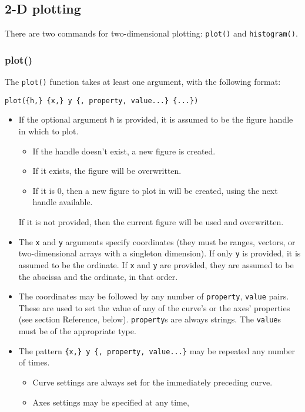\documentclass[11pt]{article}
\newcommand{\cmd}[1]{\texttt{#1}}
\begin{document}
\subsection{2-D plotting}

There are two commands for two-dimensional plotting: \cmd{plot()} and
\cmd{histogram()}.

\subsubsection{plot()}

The \cmd{plot()} function takes at least one argument, with the following
format:

\cmd{plot(\{h,\} \{x,\} y \{, property, value...\} \{...\})}

\begin{itemize}
	\item If the optional argument \cmd{h} is provided, it is assumed to be the
		figure handle in which to plot.
		\begin{itemize}
			\item If the handle doesn't exist, a new figure is created.
			\item If it exists, the figure will be overwritten.
			\item If it is 0, then a new figure to plot in will be created,
				using the next handle available.
		\end{itemize}
		If it is not provided, then the current figure will be used and
		overwritten.
	\item The \cmd{x} and \cmd{y} arguments specify coordinates (they must be ranges, vectors, or
		two-dimensional arrays with a singleton dimension). If only \cmd{y} is
		provided, it is assumed to be the ordinate. If \cmd{x} and \cmd{y} are provided, they
		are assumed to be the abscissa and the ordinate, in that order.
	\item The coordinates may be followed by any number of
		\cmd{property}, \cmd{value} pairs. These are used to set the value of
		any of the curve's or the axes' properties (see section Reference,
		below). \cmd{property}s are always strings. The \cmd{value}s must be of
		the appropriate type.
	\item The pattern \cmd{\{x,\} y \{, property, value...\}} may be repeated
		any number of times.
		\begin{itemize}
			\item Curve settings are always set for the immediately
				preceding curve.
			\item Axes settings may be specified at any time,

\end{itemize}
\end{itemize}
\end{document}

